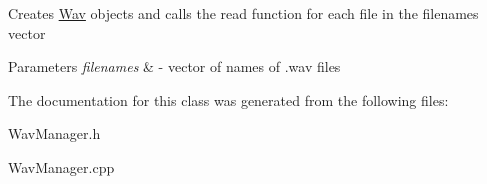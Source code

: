 Creates \hyperlink{classWav}{Wav} objects and calls the read function for each file in the filenames vector 
\begin{DoxyParams}{Parameters}
{\em filenames} & -\/ vector of names of .wav files \\
\hline
\end{DoxyParams}


The documentation for this class was generated from the following files\+:\begin{DoxyCompactItemize}
\item 
Wav\+Manager.\+h\item 
Wav\+Manager.\+cpp\end{DoxyCompactItemize}
